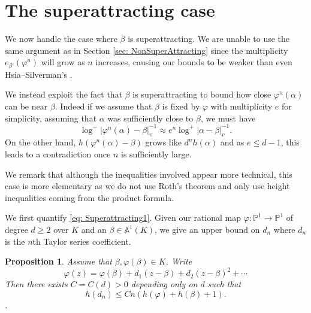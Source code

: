 \documentclass[10pt, reqno]{amsart}
\newcommand{\bb}{\mathbb}
\newcommand{\vphi}{\varphi}
\numberwithin{theorem}{section}
\newtheorem{proposition}[theorem]{Proposition}
\numberwithin{equation}{section}
\numberwithin{example}{section}
\numberwithin{definition}{section}
\begin{document}
\section{The superattracting case} \label{sec: Superattracting}
We now handle the case where $\beta$ is superattracting. We are unable to use the same argument as in Section \ref{sec: NonSuperAttracting} since the multiplicity $e_{\beta'}(\vphi^n)$ will grow as $n$ increases, causing our bounds to be weaker than even Hsia--Silverman's \cite{HS11}.
\par 
We instead exploit the fact that $\beta$ is superattracting to bound how close $\vphi^{n}(\alpha)$ can be near $\beta$. Indeed if we assume that $\beta$ is fixed by $\vphi$ with multiplicity $e$ for simplicity, assuming that $\alpha$ was sufficiently close to $\beta$, we must have 
\begin{equation} \label{eq: Superattracting1}
\log^+|\vphi^{n}(\alpha) - \beta|^{-1}_v \approx e^n \log^+|\alpha - \beta|^{-1}_v.
\end{equation}
On the other hand, $h(\vphi^n(\alpha) -\beta)$ grows like $d^n h(\alpha)$ and as $e \leq d-1$, this leads to a contradiction once $n$ is sufficiently large.  
\par 
We remark that although the inequalities involved appear more technical, this case is more elementary as we do not use Roth's theorem and only use height inequalities coming from the product formula.
\par 
We first quantify \eqref{eq: Superattracting1}. Given our rational map $\vphi: \bb{P}^1 \to \bb{P}^1$ of degree $d \geq 2$ over $K$ and an $\beta \in \bb{A}^1(K)$, we give an upper bound on $d_n$ where $d_n$ is the $n$th Taylor series coefficient. 

\begin{proposition} \label{DerivativeBound1}
 Assume that $\beta,\vphi(\beta) \in K$. Write 
 $$\vphi(z) = \vphi(\beta) + d_1 (z-\beta) + d_2 (z-\beta)^2 + \cdots$$
 Then there exists $C = C(d) > 0$ depending only on $d$ such that  
$$h(d_n) \leq Cn(h(\vphi) + h(\beta)+1).$$. 
\end{proposition}
\end{document}

